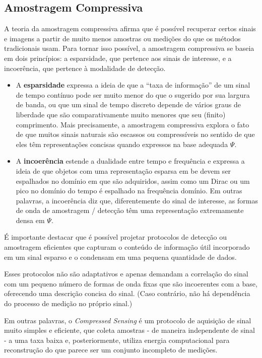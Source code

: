 \documentclass[a4paper, 12pt]{article}
\begin{document}
\subsection{Amostragem Compressiva}

A teoria da amostragem compressiva afirma que é possível recuperar certos sinais e imagens a partir de muito menos amostras ou medições do que os métodos tradicionais usam. Para tornar isso possível, a amostragem compressiva se baseia em dois princípios: a esparsidade, que pertence aos sinais de interesse, e a incoerência, que pertence à modalidade de detecção.

\begin{itemize}
    \item A \textbf{esparsidade} expressa a ideia de que a ``taxa de informação'' de um sinal de tempo contínuo pode ser muito menor do que o sugerido por sua largura de banda, ou que um sinal de tempo discreto depende de vários graus de liberdade que são comparativamente muito menores que seu (finito) comprimento. Mais precisamente, a amostragem compressiva explora o fato de que muitos sinais naturais são escassos ou compressíveis no sentido de que eles têm representações concisas quando expressos na base adequada $\Psi$.
    \item A \textbf{incoerência} estende a dualidade entre tempo e frequência e expressa a ideia de que objetos com uma representação esparsa em be devem ser espalhados no domínio em que são adquiridos, assim como um Dirac ou um pico no domínio do tempo é espalhado na frequência domínio. Em outras palavras, a incoerência diz que, diferentemente do sinal de interesse, as formas de onda de amostragem / detecção têm uma representação extremamente densa em $\Psi$.
\end{itemize}{}

É importante destacar que é possível projetar protocolos de detecção ou amostragem eficientes que capturam o conteúdo de informação útil incorporado em um sinal esparso e o condensam em uma pequena quantidade de dados.

Esses protocolos não são adaptativos e apenas demandam a correlação do sinal com um pequeno número de formas de onda fixas que são incoerentes com a base, oferecendo uma descrição concisa do sinal. (Caso contrário, não há dependência do processo de medição no próprio sinal.) 

Em outras palavras, o \textit{Compressed Sensing} é um protocolo de aquisição de sinal muito simples e eficiente, que coleta amostras - de maneira independente de sinal - a uma taxa baixa e, posteriormente, utiliza energia computacional para reconstrução do que parece ser um conjunto incompleto de medições.
\end{document}
